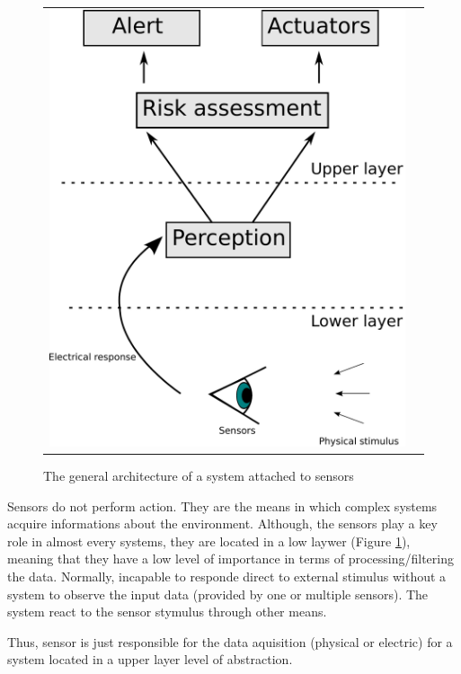 \begin{figure}[h]
   \centering
     \begin{tabular}{lr}
       \includegraphics[scale=0.45]{img/fig:sensors:role}
     \end{tabular}
   \caption{The general architecture of a system attached to sensors}
   \label{fig:sensors:role}
 \end{figure}

Sensors do not perform action. They are the means in which complex systems acquire informations about the environment. Although, the sensors play a key role in almost every systems, they are located in a low laywer (Figure \ref{fig:sensors:role}), meaning that they have a low level of importance in terms of processing/filtering the data. Normally, incapable to responde direct to external stimulus without a system to observe the input data (provided by one or multiple sensors). The system react to the sensor stymulus through other means.

Thus, sensor is just responsible for the data aquisition (physical or electric) for a system located in a upper layer level of abstraction.

